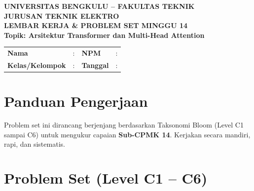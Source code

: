 \documentclass[11pt,a4paper]{article}
\begin{document}
\begin{center}
    {\large \textbf{\color{primaryblue}UNIVERSITAS BENGKULU -- FAKULTAS TEKNIK}}\\[0.1cm]
    {\large \textbf{\color{secondaryblue}JURUSAN TEKNIK ELEKTRO}}\\[0.25cm]
    {\LARGE \textbf{\color{primaryblue}LEMBAR KERJA \& PROBLEM SET MINGGU 14}}\\[0.1cm]
    {\normalsize \textbf{Topik: Arsitektur Transformer dan Multi-Head Attention}}
\end{center}

\vspace{0.2cm}

\begin{tcolorbox}[colback=boxbg,colframe=primaryblue,arc=2mm,title=\textbf{Identitas Mahasiswa}]
\small
\begin{tabular}{p{2.5cm}p{5.5cm}p{2.5cm}p{4.5cm}}
\textbf{Nama} & : \dotfill & \textbf{NPM} & : \dotfill \\
\textbf{Kelas/Kelompok} & : \dotfill & \textbf{Tanggal} & : \dotfill \\
\end{tabular}
\end{tcolorbox}

\vspace{0.2cm}

\section{Panduan Pengerjaan}
Problem set ini dirancang berjenjang berdasarkan Taksonomi Bloom (Level C1 sampai C6) untuk mengukur capaian \textbf{Sub-CPMK 14}. Kerjakan secara mandiri, rapi, dan sistematis.

\section{Problem Set (Level C1 -- C6)}
\end{document}
